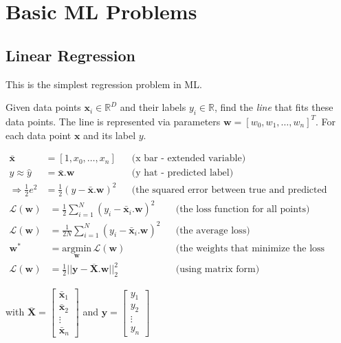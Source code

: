 \chapter{Basic ML Problems}

\section{Linear Regression}
This is the simplest regression problem in \ac{ML}.

 Given data points $\textbf{x}_i \in \mathbb{R}^D$ and their labels $y_i \in \mathbb{R}$, find the \textit{line} that fits these data points. The line is represented via parameters $\textbf{w} = [w_0, w_1, \dots, w_n]^T$. For each data point $\textbf{x}$ and its label $y$.

\begin{align*}
	\bar{\textbf{x}} &= [1, x_0, \dots, x_n] && \text{(x bar - extended variable)}\\
	y \approx \hat{y} &= \bar{\textbf{x}} . \textbf{w} && \text{(y hat - predicted label)}\\
	\Rightarrow \frac{1}{2}e^2 &= \frac{1}{2} \left(y - \bar{\textbf{x}}.\textbf{w}\right)^2 && \text{(the squared error between true and predicted labels)}
\end{align*}
\begin{align}
	\mathcal{L}(\textbf{w}) &= \frac{1}{2} \sum_{i=1}^{N} \left(y_i - \bar{\textbf{x}}_i.\textbf{w}\right) ^2 && \text{(the loss function for all points)} \\
	\mathcal{L}(\textbf{w}) &= \frac{1}{2N} \sum_{i=1}^{N} \left(y_i - \bar{\textbf{x}}_i.\textbf{w}\right) ^2 && \text{(the average loss)} \\
	\textbf{w}^* &= \underset{\textbf{w}}{\text{argmin}}\,\mathcal{L}(\textbf{w}) && \text{(the weights that minimize the loss function)} \\
	\mathcal{L}(\textbf{w}) &= \frac{1}{2} ||\textbf{y}-\overline{\textbf{X}}.\textbf{w}||^2_2 && \text{(using matrix form)}
\end{align}

with $\overline{\textbf{X}} = \begin{bmatrix}
	\bar{\textbf{x}}_1 \\
	\bar{\textbf{x}}_2 \\
	\vdots \\
	\bar{\textbf{x}}_n
\end{bmatrix}$
and $\textbf{y} = \begin{bmatrix}
	y_1 \\
	y_2 \\
	\vdots \\
	y_n	
\end{bmatrix}$

